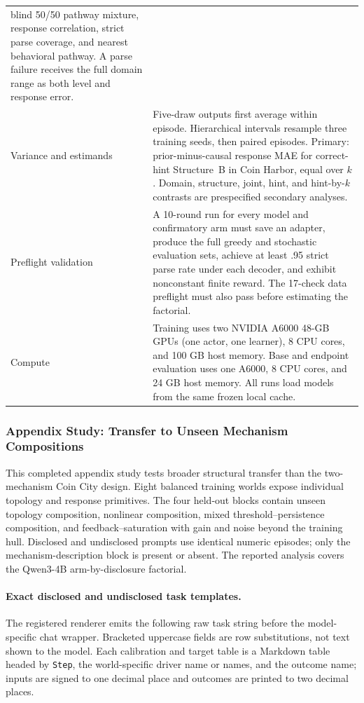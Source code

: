 \begin{center}
\begin{minipage}{\linewidth}
\begin{tabular}{p{.29\linewidth}p{.66\linewidth}}
blind 50/50 pathway mixture, response correlation, strict parse coverage, and
nearest behavioral pathway. A parse failure receives the full domain range as
both level and response error. \\
Variance and estimands & Five-draw outputs first average within episode.
Hierarchical intervals resample three training seeds, then paired episodes.
Primary: prior-minus-causal response MAE for correct-hint Structure~B in Coin
Harbor, equal over $k$. Domain, structure, joint, hint, and hint-by-$k$ contrasts
are prespecified secondary analyses. \\
Preflight validation & A 10-round run for every model and confirmatory arm must
save an adapter, produce the full greedy and stochastic evaluation sets, achieve
at least .95 strict parse rate under each decoder, and exhibit nonconstant finite
reward. The 17-check data preflight must also pass before estimating the factorial. \\
Compute & Training uses two NVIDIA A6000 48-GB GPUs (one actor, one learner),
8 CPU cores, and 100 GB host memory. Base and endpoint evaluation uses one A6000,
8 CPU cores, and 24 GB host memory. All runs load models from the same frozen
local cache. \\
\bottomrule
\end{tabular}
\end{minipage}
\end{center}

\subsubsection{Appendix Study: Transfer to Unseen Mechanism Compositions}
\label{app:exp3-expanded-structural-ood}

This completed appendix study tests broader structural transfer than the
two-mechanism Coin City design. Eight balanced training worlds expose individual
topology and response primitives. The four held-out blocks contain unseen topology
composition, nonlinear composition, mixed threshold--persistence composition, and
feedback--saturation with gain and noise beyond the training hull. Disclosed and
undisclosed prompts use identical
numeric episodes; only the mechanism-description block is present or absent. The
reported analysis covers the Qwen3-4B arm-by-disclosure factorial.

\paragraph{Exact disclosed and undisclosed task templates.}
\label{app:exp3-structural-prompts}
The registered renderer emits the following raw task string before the
model-specific chat wrapper. Bracketed uppercase fields are row substitutions,
not text shown to the model. Each calibration and target table is a Markdown
table headed by \texttt{Step}, the world-specific driver name or names, and the
outcome name; inputs are signed to one decimal place and outcomes are printed to
two decimal places.

